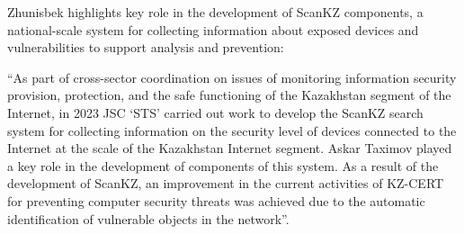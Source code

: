 Zhunisbek highlights \mrls key role in the development of ScanKZ components, a national-scale system for collecting information about exposed devices and vulnerabilities to support analysis and prevention:
\begin{fullquote}
``As part of cross-sector coordination on issues of monitoring information security provision, protection, and the safe functioning of the Kazakhstan segment of the Internet, in 2023 JSC `STS' carried out work to develop the ScanKZ search system for collecting information on the security level of devices connected to the Internet at the scale of the Kazakhstan Internet segment. Askar Taximov played a key role in the development of components of this system. As a result of the development of ScanKZ, an improvement in the current activities of KZ-CERT for preventing computer security threats was achieved due to the automatic identification of vulnerable objects in the network''.
\end{fullquote}

